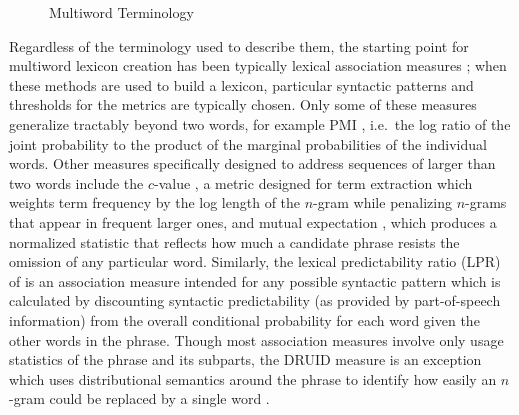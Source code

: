 \documentclass[11pt,letterpaper]{article}
\begin{document}
\begin{figure}[!t]
\caption{Multiword Terminology}
\label{fig:terminology}
\end{figure}



Regardless of the terminology used to describe them, the starting point for multiword lexicon creation has been typically lexical association measures \cite{Church90,Dunning93,Schone01,Evert04,Pecina10,DeAraujo11,Kulkarni11,Ramisch14}; when these methods are used to build a lexicon, particular syntactic patterns and thresholds for the metrics are typically chosen. Only some of these measures generalize tractably beyond two words, for example PMI \cite{Church90}, i.e.\ the log ratio of the joint probability to the product of the marginal probabilities of the individual words. Other measures specifically designed to address sequences of larger than two words include the $c$-value \cite{Frantzi00}, a metric designed for term extraction which weights term frequency by the log length of the $n$-gram while penalizing $n$-grams that appear in frequent larger ones, and mutual expectation \cite{Dias99}, which produces a normalized statistic that reflects how much a candidate phrase resists the omission of any particular word. Similarly, the lexical predictability ratio (LPR) of  is an association measure intended for any possible syntactic pattern which is calculated by discounting syntactic predictability (as provided by part-of-speech information) from the overall conditional probability for each word given the other words in the phrase. Though most association measures involve only usage statistics of the phrase and its subparts, the DRUID measure is an exception which uses distributional semantics around the phrase to identify how easily an $n$-gram could be replaced by a single word \cite{Riedl15}.
\end{document}
